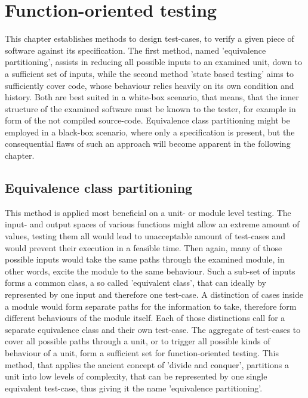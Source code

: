 		
	

	\section{Function-oriented testing}

	This chapter establishes methods to design test-cases, to verify a given piece of software against its specification. The first method, named 'equivalence partitioning', assists in reducing all possible inputs to an examined unit, down to a sufficient set of inputs, while the second method 'state based testing' aims to sufficiently cover code, whose behaviour relies heavily on its own condition and history. Both are best suited in a white-box scenario, that means, that the inner structure of the examined software must be known to the tester, for example in form of the not compiled source-code. Equivalence class partitioning might be employed in a black-box scenario, where only a specification is present, but the consequential flaws of such an approach will become apparent in the following chapter.

	\subsection{Equivalence class partitioning}
	This method is applied most beneficial on a unit- or module level testing. The input- and output spaces of various functions might allow an extreme amount of values, testing them all would lead to unacceptable amount of test-cases and would prevent their execution in a feasible time. Then again, many of those possible inputs would take the same paths through the examined module, in other words, excite the module to the same behaviour. Such a sub-set of inputs forms a common class, a so called 'equivalent class', that can ideally by represented by one input and therefore one test-case. A distinction of cases inside a module would form separate paths for the information to take, therefore form different behaviours of the module itself. Each of those distinctions call for a separate equivalence class and their own test-case. The aggregate of test-cases to cover all possible paths through a unit, or to trigger all possible kinds of behaviour of a unit, form a sufficient set for function-oriented testing. This method, that applies the ancient concept of 'divide and conquer', partitions a unit into low levels of complexity, that can be represented by one single equivalent test-case, thus giving it the name 'equivalence partitioning'.

